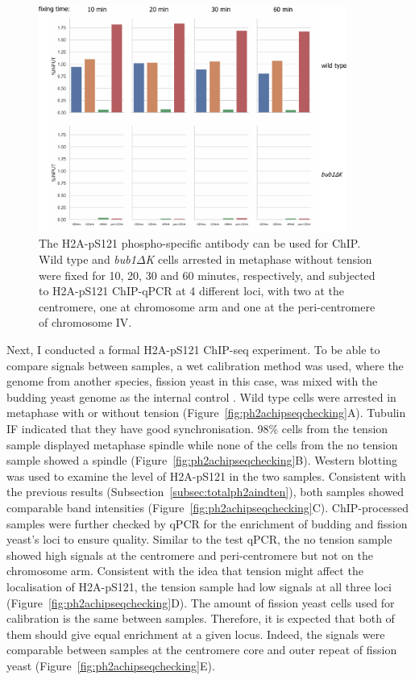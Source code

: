\begin{figure}[htbp]
  \centering
  \includegraphics[width=0.9\textwidth]{chapter3/figures/pH2A test ChIP-qPCR.pdf}
  \caption[The H2A-pS121 phospho-specific antibody can be used for ChIP]{The H2A-pS121 phospho-specific antibody can be used for ChIP. Wild type and \textit{bub1$\Delta$K} cells arrested in metaphase without tension were fixed for 10, 20, 30 and 60 minutes, respectively, and subjected to H2A-pS121 ChIP-qPCR at 4 different loci, with two at the centromere, one at chromosome arm and one at the peri-centromere of chromosome IV. }
  \label{fig:ph2atestchipqpcr}
\end{figure}

Next, I conducted a formal H2A-pS121 ChIP-seq experiment. To be able to compare signals between samples, a wet calibration method was used, where the genome from another species, fission yeast in this case, was mixed with the budding yeast genome as the internal control \citep{Hu2015BiologicalChIP-seq}. Wild type cells were arrested in metaphase with or without tension (Figure~\ref{fig:ph2achipseqchecking}A). Tubulin IF indicated that they have good synchronisation. 98\% cells from the tension sample displayed metaphase spindle while none of the cells from the no tension sample showed a spindle (Figure~\ref{fig:ph2achipseqchecking}B). Western blotting was used to examine the level of H2A-pS121 in the two samples. Consistent with the previous results (Subsection~\ref{subsec:totalph2aindten}), both samples showed comparable band intensities (Figure~\ref{fig:ph2achipseqchecking}C). ChIP-processed samples were further checked by qPCR for the enrichment of budding and fission yeast's loci to ensure quality. Similar to the test qPCR, the no tension sample showed high signals at the centromere and peri-centromere but not on the chromosome arm. Consistent with the idea that tension might affect the localisation of H2A-pS121, the tension sample had low signals at all three loci (Figure~\ref{fig:ph2achipseqchecking}D). The amount of fission yeast cells used for calibration is the same between samples. Therefore, it is expected that both of them should give equal enrichment at a given locus. Indeed, the signals were comparable between samples at the centromere core and outer repeat of fission yeast (Figure~\ref{fig:ph2achipseqchecking}E). 

